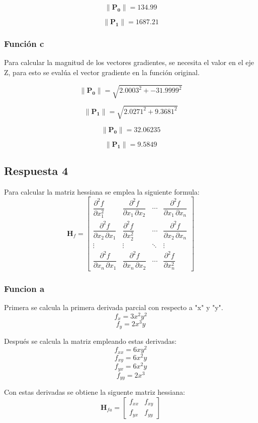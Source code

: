 \documentclass[12 pt]{article}
\begin{document}
\[
\|\mathbf{P_0}\| = 134.99
\]

\[
\|\mathbf{P_1}\| = 1687.21
\]

\subsubsection{Función c}
Para calcular la magnitud de los vectores gradientes, se necesita el valor en el eje Z, para esto se evalúa el vector gradiente en la función original.


\[
\|\mathbf{P_0}\| = \sqrt{2.0003^2 + -31.9999^2}
\]

\[
\|\mathbf{P_1}\| = \sqrt{2.0271^2 + 9.3681^2}
\]

\[
\|\mathbf{P_0}\| = 32.06235
\]

\[
\|\mathbf{P_1}\| = 9.5849
\]


\subsection{Respuesta 4}
Para calcular la matriz hessiana se emplea la siguiente formula:
\[
\mathbf H_f= \begin{bmatrix}
  \dfrac{\partial^2 f}{\partial x_1^2} & \dfrac{\partial^2 f}{\partial x_1\,\partial x_2} & \cdots & \dfrac{\partial^2 f}{\partial x_1\,\partial x_n} \\[2.2ex]
  \dfrac{\partial^2 f}{\partial x_2\,\partial x_1} & \dfrac{\partial^2 f}{\partial x_2^2} & \cdots & \dfrac{\partial^2 f}{\partial x_2\,\partial x_n} \\[2.2ex]
  \vdots & \vdots & \ddots & \vdots \\[2.2ex]
  \dfrac{\partial^2 f}{\partial x_n\,\partial x_1} & \dfrac{\partial^2 f}{\partial x_n\,\partial x_2} & \cdots & \dfrac{\partial^2 f}{\partial x_n^2}
\end{bmatrix}
\]

\subsubsection{Funcion a}
Primera se calcula la primera derivada parcial con respecto a "x" y "y".
\[
    f_x = 3x^2y^2
\]
\[
    f_y = 2x^3y
\]

Después se calcula la matriz empleando estas derivadas:
\[
f_{xx} = 6 x y^2
\]
\[
f_{xy} = 6 x^2 y
\]
\[
f_{yx} = 6 x^2 y
\]
\[
f_{yy} =  2 x^3
\]

Con estas derivadas se obtiene la siguente matriz hessiana:
\[
\mathbf H_{fa}= \begin{bmatrix}
  f_{xx} & f_{xy} \\
  f_{yx} & f_{yy}
\end{bmatrix}
\]
\end{document}
